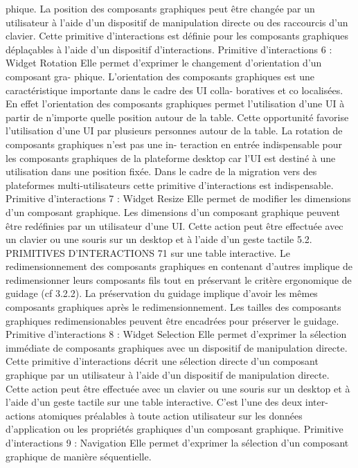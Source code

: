 \documentclass{article}
\begin{document}
phique.
La position des composants graphiques peut être changée par un utilisateur à l’aide d’un dispositif de
manipulation directe ou des raccourcis d’un clavier. Cette primitive d’interactions est déﬁnie pour les
composants graphiques déplaçables à l’aide d’un dispositif d’interactions.
Primitive d’interactions 6 : Widget Rotation
Elle permet d’exprimer le changement d’orientation d’un composant gra-
phique.
L’orientation des composants graphiques est une caractéristique importante dans le cadre des UI colla-
boratives et co localisées. En effet l’orientation des composants graphiques permet l’utilisation d’une
UI à partir de n’importe quelle position autour de la table. Cette opportunité favorise l’utilisation d’une
UI par plusieurs personnes autour de la table. La rotation de composants graphiques n’est pas une in-
teraction en entrée indispensable pour les composants graphiques de la plateforme desktop car l’UI
est destiné à une utilisation dans une position ﬁxée. Dans le cadre de la migration vers des plateformes
multi-utilisateurs cette primitive d’interactions est indispensable.
Primitive d’interactions 7 : Widget Resize
Elle permet de modiﬁer les dimensions d’un composant graphique.
Les dimensions d’un composant graphique peuvent être redéﬁnies par un utilisateur d’une UI. Cette
action peut être effectuée avec un clavier ou une souris sur un desktop et à l’aide d’un geste tactile
5.2. PRIMITIVES D’INTERACTIONS
71
sur une table interactive. Le redimensionnement des composants graphiques en contenant d’autres
implique de redimensionner leurs composants ﬁls tout en préservant le critère ergonomique de guidage
(cf 3.2.2). La préservation du guidage implique d’avoir les mêmes composants graphiques après le
redimensionnement. Les tailles des composants graphiques redimensionables peuvent être encadrées
pour préserver le guidage.
Primitive d’interactions 8 : Widget Selection
Elle permet d’exprimer la sélection immédiate de composants graphiques
avec un dispositif de manipulation directe.
Cette primitive d’interactions décrit une sélection directe d’un composant graphique par un utilisateur
à l’aide d’un dispositif de manipulation directe. Cette action peut être effectuée avec un clavier ou une
souris sur un desktop et à l’aide d’un geste tactile sur une table interactive. C’est l’une des deux inter-
actions atomiques préalables à toute action utilisateur sur les données d’application ou les propriétés
graphiques d’un composant graphique.
Primitive d’interactions 9 : Navigation
Elle permet d’exprimer la sélection d’un composant graphique de manière
séquentielle.
\end{document}
